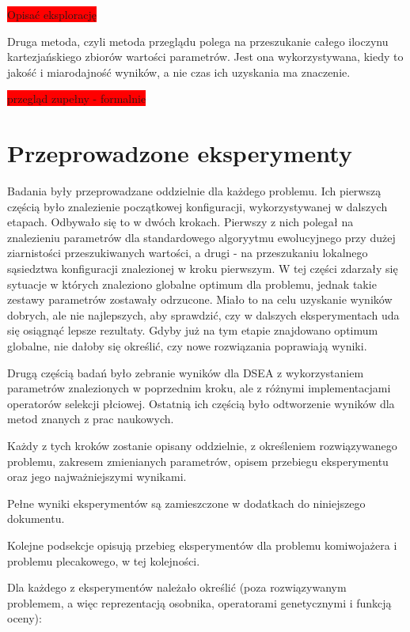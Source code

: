 \documentclass[twoside]{iisthesis}
\newcommand{\todo}{\colorbox{red}}
\begin{document}
\todo{Opisać eksplorację}

Druga metoda, czyli metoda przeglądu polega na przeszukanie całego iloczynu kartezjańskiego zbiorów wartości parametrów.
Jest ona wykorzystywana, kiedy to jakość i miarodajność wyników, a nie czas ich uzyskania ma znaczenie.

\todo{przegląd zupełny - formalnie}

\section{Przeprowadzone eksperymenty}

Badania były przeprowadzane oddzielnie dla każdego problemu.
Ich pierwszą częścią było znalezienie początkowej konfiguracji, wykorzystywanej w dalszych etapach.
Odbywało się to w dwóch krokach.
Pierwszy z nich polegał na znalezieniu parametrów dla standardowego algoryytmu ewolucyjnego przy dużej ziarnistości przeszukiwanych wartości, a drugi - na przeszukaniu lokalnego sąsiedztwa konfiguracji znalezionej w kroku pierwszym.
W tej części zdarzały się sytuacje w których znaleziono globalne optimum dla problemu, jednak takie zestawy parametrów zostawały odrzucone.
Miało to na celu uzyskanie wyników dobrych, ale nie najlepszych, aby sprawdzić, czy w dalszych eksperymentach uda się osiągnąć lepsze rezultaty.
Gdyby już na tym etapie znajdowano optimum globalne, nie dałoby się określić, czy nowe rozwiązania poprawiają wyniki.

Drugą częścią badań było zebranie wyników dla DSEA z wykorzystaniem parametrów znalezionych w poprzednim kroku, ale z różnymi implementacjami operatorów selekcji płciowej.
Ostatnią ich częścią było odtworzenie wyników dla metod znanych z prac naukowych.

Każdy z tych kroków zostanie opisany oddzielnie, z określeniem rozwiązywanego problemu, zakresem zmienianych parametrów, opisem przebiegu eksperymentu oraz jego najważniejszymi wynikami.

Pełne wyniki eksperymentów są zamieszczone w dodatkach do niniejszego dokumentu.

Kolejne podsekcje opisują przebieg eksperymentów dla problemu komiwojażera i problemu plecakowego, w tej kolejności.

Dla każdego z eksperymentów należało określić (poza rozwiązywanym problemem, a więc reprezentacją osobnika, operatorami genetycznymi i funkcją oceny):
\end{document}
